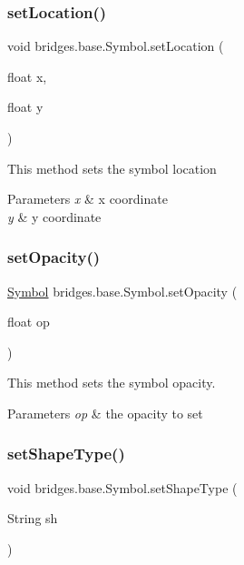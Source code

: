 \subsubsection{\texorpdfstring{set\+Location()}{setLocation()}}
{\footnotesize\ttfamily void bridges.\+base.\+Symbol.\+set\+Location (\begin{DoxyParamCaption}\item[{float}]{x,  }\item[{float}]{y }\end{DoxyParamCaption})}

This method sets the symbol location


\begin{DoxyParams}{Parameters}
{\em x} & x coordinate \\
\hline
{\em y} & y coordinate \\
\hline
\end{DoxyParams}
\mbox{\label{classbridges_1_1base_1_1_symbol_abac237b439448cbef3744817d14061c5}} 
\subsubsection{\texorpdfstring{set\+Opacity()}{setOpacity()}}
{\footnotesize\ttfamily \mbox{\hyperlink{classbridges_1_1base_1_1_symbol}{Symbol}} bridges.\+base.\+Symbol.\+set\+Opacity (\begin{DoxyParamCaption}\item[{float}]{op }\end{DoxyParamCaption})}



This method sets the symbol opacity. 


\begin{DoxyParams}{Parameters}
{\em op} & the opacity to set \\
\hline
\end{DoxyParams}
\mbox{\label{classbridges_1_1base_1_1_symbol_adf9559ecef8902f83cbb6bbefdf1c601}} 
\subsubsection{\texorpdfstring{set\+Shape\+Type()}{setShapeType()}}
{\footnotesize\ttfamily void bridges.\+base.\+Symbol.\+set\+Shape\+Type (\begin{DoxyParamCaption}\item[{String}]{sh }\end{DoxyParamCaption})\hspace{0.3cm}{\ttfamily [protected]}}

